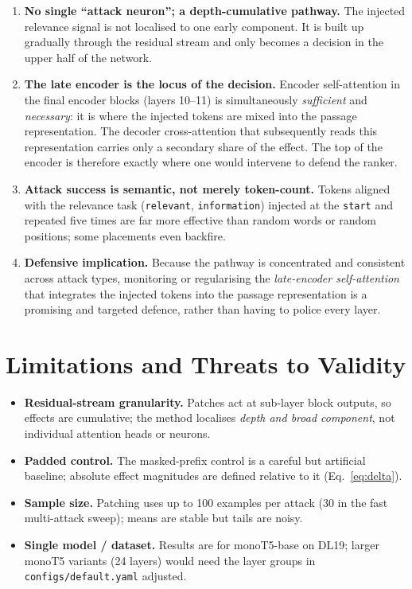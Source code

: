\documentclass[11pt]{article}
\begin{document}
\begin{enumerate}
  \item \textbf{No single ``attack neuron''; a depth-cumulative pathway.} The
        injected relevance signal is not localised to one early component. It is
        built up gradually through the residual stream and only becomes a
        decision in the upper half of the network.
  \item \textbf{The late encoder is the locus of the decision.} Encoder
        self-attention in the final encoder blocks (layers 10--11) is
        simultaneously \emph{sufficient} and \emph{necessary}: it is where the
        injected tokens are mixed into the passage representation. The decoder
        cross-attention that subsequently reads this representation carries only
        a secondary share of the effect. The top of the encoder is therefore
        exactly where one would intervene to defend the ranker.
  \item \textbf{Attack success is semantic, not merely token-count.} Tokens
        aligned with the relevance task (\texttt{relevant}, \texttt{information})
        injected at the \texttt{start} and repeated five times are far more
        effective than random words or random positions; some placements even
        backfire.
  \item \textbf{Defensive implication.} Because the pathway is concentrated and
        consistent across attack types, monitoring or regularising the
        \emph{late-encoder self-attention} that integrates the injected tokens
        into the passage representation is a promising and targeted defence,
        rather than having to police every layer.
\end{enumerate}

\section{Limitations and Threats to Validity}
\label{sec:limits}

\begin{itemize}
  \item \textbf{Residual-stream granularity.} Patches act at sub-layer block
        outputs, so effects are cumulative; the method localises \emph{depth and
        broad component}, not individual attention heads or neurons.
  \item \textbf{Padded control.} The masked-prefix control is a careful but
        artificial baseline; absolute effect magnitudes are defined relative to
        it (Eq.~\ref{eq:delta}).
  \item \textbf{Sample size.} Patching uses up to 100 examples per attack (30 in
        the fast multi-attack sweep); means are stable but tails are noisy.
  \item \textbf{Single model / dataset.} Results are for monoT5-base on DL19;
        larger monoT5 variants (24 layers) would need the layer groups in
        \texttt{configs/default.yaml} adjusted.
\end{itemize}
\end{document}
